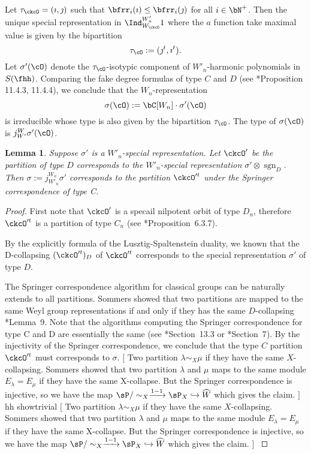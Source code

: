 \documentclass[12pt,a4paper]{amsart}
\newcommand{\trivial}[2][]{\if\relax\detokenize{#1}\relax
  {%
      \color{orange} \vspace{0em} $[$  #2 $]$
      \color{black}
  }
  \else
\ifx#1h
\ifcsname showtrivial\endcsname
{%
    \color{orange} \vspace{0em}  $[$ #2 $]$
    \color{black}
}
\fi
\else {\red Wrong argument!} \fi
\fi
}
\newcommand{\sgn}{\operatorname{sgn}}
\numberwithin{equation}{section}
\newtheorem{lem}[thm]{Lemma}
\theoremstyle{remark}
\begin{document}
Let $\tau_\ckcO  = (\imath,\jmath)$ such that $\bfrr_i(\imath)\leq \bfrr_i(\jmath)$ for all $i\in \bN^+$.
Then the unique special representation
in $\Ind_{W_\ckcO}^{W'_n} 1$ where the $a$ function take maximal value is given
by the bipartition
\[
  \tau_{\cO}:=(\jmath^t,\imath^t).
\]
Let $\sigma'(\cO)$ denote the $\tau_{\cO}$-isotypic component of $W'_n$-harmonic polynomials in $S(\fhh)$.
Comparing the  fake degree formulas of type $C$ and $D$ (see \cite{Carter}*{Proposition 11.4.3, 11.4.4}), we conclude that
the $W_n$-representation
\begin{equation}\label{eq:sigma.tC}
\sigma(\cO):= \bC[W_n]\cdot \sigma'(\cO)
\end{equation}
is irreducible whose type is also given by the
bipartition $\tau_{\cO}$. The type of $\sigma(\cO)$ is $j_{W'}^{W} \sigma'(\cO)$.

\begin{lem}\label{lem:MD1}
  Suppose $\sigma'$ is a $W'_n$-special representation.%
  Let $\ckcO'$ be the partition of type $D$ corresponds to the $W'_n$-special representation
  $\sigma'\otimes \sgn_D$. Then $\sigma:=j_{W'_n}^{W_n} \sigma'$ corresponds to the partition $\ckcO'^t$ under the Springer correspondence of
  type C.
\end{lem}
\begin{proof}
  First note that $\ckcO'$ is a specail nilpotent orbit of type $D_n$,
  therefore $\ckcO'^t$ is a partition of type $C_n$ (see \cite{CM}*{Proposition~6.3.7}).

  By the explicitly formula of the Lusztig-Spaltenstein duality, we known that the D-collapsing
  $(\ckcO'^t)_D$ of $\ckcO'^t$ corresponds to the special representation
  $\sigma'$ of type $D$.

  The Springer correspondence algorithm for classical groups can be naturally extends to all partitions.
  Sommers showed that two partitions are mapped to the same Weyl group representations
  if and only if they has the same $D$-collapsing \cite{So}*{Lemma~9}.
  Note that the algorithms computing the Springer correspondence for type C and D are essentially the same
  (see \cite{Carter}*{Section~13.3} or \cite{So}*{Section~7}).
  By the injectivity of the Springer correspondence, we conclude that the type $C$ partition $\ckcO'^t$
  must corresponds to $\sigma$.
  \trivial[h]{
    Two partition $\lambda\sim_X \mu$ if they have the same $X$-collapsing.
  Sommers showed that two partition $\lambda$ and $\mu$ maps to the same module $E_\lambda = E_\mu$
  if they have the same X-collapse. But the Springer correspondence is injective,
  so we have the map $\sP/\sim_X \xrightarrow{1-1} \sP_X \hookrightarrow \widehat{W}$
  which gives the claim.
  }
\end{proof}
\end{document}
